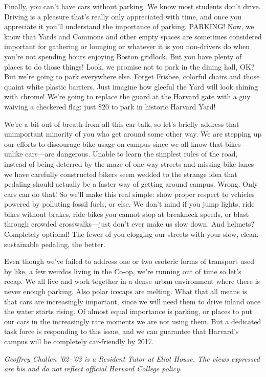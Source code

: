 Finally, you can't have cars without parking. We know most students don't
drive. Driving is a pleasure that's really only appreciated with time, and
once you appreciate it you'll understand the importance of parking. PARKING!
Now, we know that Yards and Commons and other empty spaces are sometimes
considered important for gathering or lounging or whatever it is you
non-drivers do when you're not spending hours enjoying Boston gridlock. But
you have plenty of places to do those things! Look, we promise not to park in
the dining hall, OK? But we're going to park everywhere else. Forget Frisbee,
colorful chairs and those quaint white plastic barriers. Just imagine how
gleeful the Yard will look shining with chrome! We're going to replace the
guard at the Harvard gate with a guy waiving a checkered flag: just \$20 to
park in historic Harvard Yard!

We're a bit out of breath from all this car talk, so let's briefly address
that unimportant minority of you who get around some other way. We are
stepping up our efforts to discourage bike usage on campus since we all know
that bikes---unlike cars---are dangerous. Unable to learn the simplest rules
of the road, instead of being deterred by the maze of one-way streets and
missing bike lanes we have carefully constructed bikers seem wedded to the
strange idea that pedaling should actually be a faster way of getting around
campus. Wrong. Only cars can do that!  So we'll make this real simple: show
proper respect to vehicles powered by polluting fossil fuels, or else. We
don't mind if you jump lights, ride bikes without brakes, ride bikes you
cannot stop at breakneck speeds, or blast through crowded crosswalks---just
don't ever make us slow down. And helmets? Completely optional! The fewer of
you clogging our streets with your slow, clean, sustainable pedaling, the
better.

Even though we've failed to address one or two esoteric forms of transport
used by like, a few weirdos living in the Co-op, we're running out of time so
let's recap.  We all live and work together in a dense urban environment
where there is never enough parking. Also polar icecaps are melting. What
that all means is that cars are increasingly important, since we will need
them to drive inland once the water starts rising. Of almost equal importance
is parking, or places to put our cars in the increasingly rare moments we are
not using them. But a dedicated task force is responding to this issue, and
we can guarantee that Harvard's campus will be completely car-friendly by
2017.


\textit{Geoffrey Challen '02--'03 is a Resident Tutor at Eliot House. The
views expressed are his and do not reflect official Harvard College policy.}
